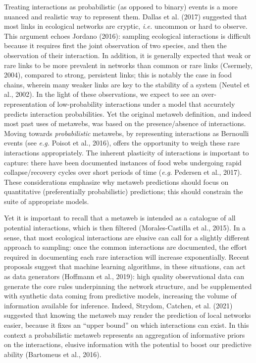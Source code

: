 \documentclass[10pt,oneside]{article}
\begin{document}
Treating interactions as probabilistic (as opposed to binary) events is
a more nuanced and realistic way to represent them. Dallas et al. (2017)
suggested that most links in ecological networks are cryptic,
\emph{i.e.} uncommon or hard to observe. This argument echoes Jordano
(2016): sampling ecological interactions is difficult because it
requires first the joint observation of two species, and then the
observation of their interaction. In addition, it is generally expected
that weak or rare links to be more prevalent in networks than common or
rare links (Csermely, 2004), compared to strong, persistent links; this
is notably the case in food chains, wherein many weaker links are key to
the stability of a system (Neutel et al., 2002). In the light of these
observations, we expect to see an over-representation of low-probability
interactions under a model that accurately predicts interaction
probabilities. Yet the original metaweb definition, and indeed most past
uses of metawebs, was based on the presence/absence of interactions.
Moving towards \emph{probabilistic} metawebs, by representing
interactions as Bernoulli events (see \emph{e.g.} Poisot et al., 2016),
offers the opportunity to weigh these rare interactions appropriately.
The inherent plasticity of interactions is important to capture: there
have been documented instances of food webs undergoing rapid
collapse/recovery cycles over short periods of time (\emph{e.g.}
Pedersen et al., 2017). These considerations emphasize why metaweb
predictions should focus on quantitative (preferentially probabilistic)
predictions; this should constrain the suite of appropriate models.

Yet it is important to recall that a metaweb is intended as a catalogue
of all potential interactions, which is then filtered (Morales-Castilla
et al., 2015). In a sense, that most ecological interactions are elusive
can call for a slightly different approach to sampling: once the common
interactions are documented, the effort required in documenting each
rare interaction will increase exponentially. Recent proposals suggest
that machine learning algorithms, in these situations, can act as data
generators (Hoffmann et al., 2019): high quality observational data can
generate the core rules underpinning the network structure, and be
supplemented with synthetic data coming from predictive models,
increasing the volume of information available for inference. Indeed,
Strydom, Catchen, et al. (2021) suggested that knowing the metaweb may
render the prediction of local networks easier, because it fixes an
``upper bound'' on which interactions can exist. In this context a
probabilistic metaweb represents an aggregation of informative priors on
the interactions, elusive information with the potential to boost our
predictive ability (Bartomeus et al., 2016).
\end{document}
